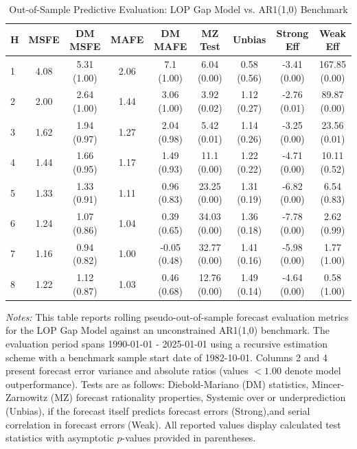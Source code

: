 \begin{table}[htbp]
\centering
\caption{Out-of-Sample Predictive Evaluation: LOP Gap Model vs. AR1(1,0) Benchmark}
\label{tab:lop_gap_model_evaluation}
\footnotesize
\begin{tabular}{l cccccccc}
\hline\hline
\rule{0pt}{3ex}
\textbf{H} & \textbf{MSFE} & \textbf{DM MSFE} & \textbf{MAFE} & \textbf{DM MAFE} & \textbf{MZ Test} & \textbf{Unbias} & \textbf{Strong Eff} & \textbf{Weak Eff} \\[0.5ex]
\hline
\rule{0pt}{2.5ex}
1 & 4.08 & 5.31 (1.00) & 2.06 & 7.1 (1.00) & 6.04 (0.00) & 0.58 (0.56) & -3.41 (0.00) & 167.85 (0.00) \\
2 & 2.00 & 2.64 (1.00) & 1.44 & 3.06 (1.00) & 3.92 (0.02) & 1.12 (0.27) & -2.76 (0.01) & 89.87 (0.00) \\
3 & 1.62 & 1.94 (0.97) & 1.27 & 2.04 (0.98) & 5.42 (0.01) & 1.14 (0.26) & -3.25 (0.00) & 23.56 (0.01) \\
4 & 1.44 & 1.66 (0.95) & 1.17 & 1.49 (0.93) & 11.1 (0.00) & 1.22 (0.22) & -4.71 (0.00) & 10.11 (0.52) \\
5 & 1.33 & 1.33 (0.91) & 1.11 & 0.96 (0.83) & 23.25 (0.00) & 1.31 (0.19) & -6.82 (0.00) & 6.54 (0.83) \\
6 & 1.24 & 1.07 (0.86) & 1.04 & 0.39 (0.65) & 34.03 (0.00) & 1.36 (0.18) & -7.78 (0.00) & 2.62 (0.99) \\
7 & 1.16 & 0.94 (0.82) & 1.00 & -0.05 (0.48) & 32.77 (0.00) & 1.41 (0.16) & -5.98 (0.00) & 1.77 (1.00) \\
8 & 1.22 & 1.12 (0.87) & 1.03 & 0.46 (0.68) & 12.76 (0.00) & 1.49 (0.14) & -4.64 (0.00) & 0.58 (1.00) \\
\hline\hline
\end{tabular}%
\par\smallskip
\parbox{\textwidth}{\scriptsize \textit{Notes:} This table reports rolling pseudo-out-of-sample forecast evaluation metrics for the LOP Gap Model against an unconstrained AR1(1,0) benchmark. The evaluation period spans 1990-01-01 - 2025-01-01 using a recursive estimation scheme with a benchmark sample start date of 1982-10-01. Columns 2 and 4 present forecast error variance and absolute ratios (values $< 1.00$ denote model outperformance). Tests are as follows: Diebold-Mariano (DM) statistics, Mincer-Zarnowitz (MZ) forecast rationality properties, Systemic over or underprediction (Unbias), if the forecast itself predicts forecast errors (Strong),and serial correlation in forecast errors (Weak). All reported values display calculated test statistics with asymptotic $p$-values provided in parentheses.}
\end{table}
